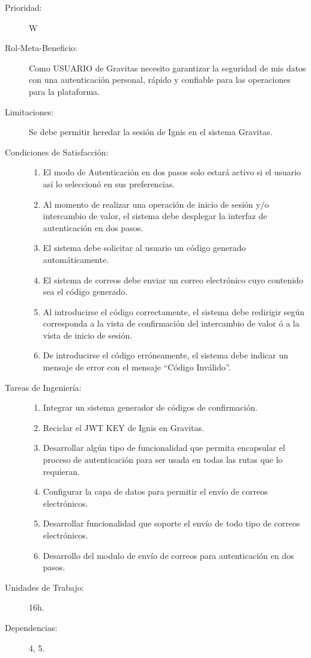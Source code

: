 \begin{description}
    \item[Prioridad:] W
    \item[Rol-Meta-Beneficio:] Como USUARIO de Gravitas necesito garantizar la seguridad de mis datos con una autenticación personal, rápido y confiable para las operaciones  para la plataforma.
    \item[Limitaciones:] Se debe permitir heredar la sesión de Ignis en el sistema Gravitas.
    \item[Condiciones de Satisfacción:] \hfill
        \begin{enumerate}
            \item El modo de Autenticación en dos pasos solo estará activo si el usuario así lo seleccionó en sus preferencias.
            \item Al momento de realizar una operación de inicio de sesión y/o intercambio de valor, el sistema debe desplegar la interfaz de autenticación en dos pasos.
            \item El sistema debe solicitar al usuario un código generado automáticamente.
            \item El sistema de correos debe enviar un correo electrónico cuyo contenido sea el código generado.
            \item Al introducirse el código correctamente, el sistema debe redirigir según corresponda a la vista de confirmación del intercambio de valor ó  a la vista de inicio de sesión.
            \item De introducirse el código erróneamente, el sistema debe indicar un mensaje de error con el mensaje “Código Inválido”.
        \end{enumerate}
    \item[Tareas de Ingeniería:] \hfill
        \begin{enumerate}
            \item Integrar un sistema generador de códigos de confirmación.
            \item Reciclar el JWT KEY de Ignis en Gravitas.
            \item Desarrollar algún tipo de funcionalidad que permita encapsular el proceso de autenticación para ser usada en todas las rutas que lo requieran.
            \item Configurar la capa de datos para permitir el envío de correos electrónicos.
            \item Desarrollar funcionalidad que soporte el envío de todo tipo de correos electrónicos.
            \item Desarrollo del modulo de envío de correos para autenticación en dos pasos.
        \end{enumerate}
    \item[Unidades de Trabajo:] 16h.
    \item[Dependencias:] 4, 5.
\end{description}

